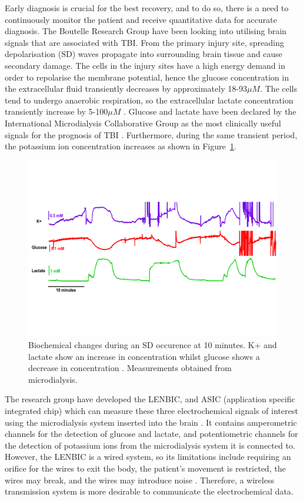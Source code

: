 Early diagnosis is crucial for the best recovery, and to do so, there is a need to continuously monitor the patient and receive quantitative data for accurate diagnosis. The Boutelle Research Group have been looking into utilising brain signals that are associated with TBI. From the primary injury site, spreading depolarisation (SD) waves propagate into surrounding brain tissue and cause secondary damage. The cells in the injury sites have a high energy demand in order to repolarise the membrane potential, hence the glucose concentration in the extracellular fluid transiently decreases by approximately 18-93$\mu M$. The cells tend to undergo anaerobic respiration, so the extracellular lactate concentration transiently increase by 5-100$\mu M$ \cite{D.2010}. Glucose and lactate have been declared by the International Microdialysis Collaborative Group as the most clinically useful signals for the prognosis of TBI \cite{Hutchinson2015}. Furthermore, during the same transient period, the potassium ion concentration increases \cite{Rogers2017} as shown in Figure~\ref{fig: SD}.

\begin{figure}[t]
\centering
\includegraphics[trim={0cm 5cm 0.5cm  5cm}, clip, width=1\textwidth]{./figures/conc.pdf}
\captionsetup{justification=centering}
\caption{Biochemical changes during an SD occurence at 10 minutes. K+ and lactate show an increase in concentration whilst glucose shows a decrease in concentration \cite{Rogers2017}. Measurements obtained from microdialysis.}
\label{fig: SD}
\end{figure}

The research group have developed the LENBIC, and ASIC (application specific integrated chip) which can measure these three electrochemical signals of interest using the microdialysis system inserted into the brain \cite{Pagkalos2017}. It contains amperometric channels for the detection of glucose and lactate, and potentiometric channels for the detection of potassium ions from the microdialysis system it is connected to. However, the LENBIC is a wired system, so its limitations include requiring an orifice for the wires to exit the body, the patient's movement is restricted, the wires may break, and the wires may introduce noise \cite{Ferguson2011}. Therefore, a wireless transmission system is more desirable to communicate the electrochemical data. 

